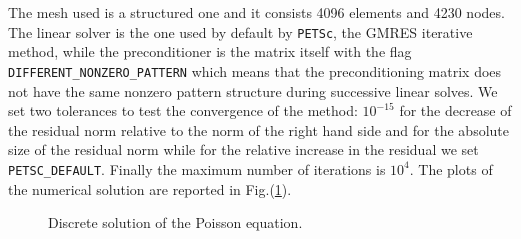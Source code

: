 The mesh used is a structured one and it consists 4096 elements and 4230 nodes. The linear solver is the one used by default by \verb|PETSc|, the GMRES iterative method, while the preconditioner is the matrix itself with the flag \verb|DIFFERENT_NONZERO_PATTERN| which means that the preconditioning matrix does not have the same nonzero pattern structure during successive linear solves. We set two tolerances to test the convergence of the method: $10^{-15}$ for the decrease of the residual norm relative to the norm of the right hand side and for the absolute size of the residual norm while for the relative increase in the residual we set \verb|PETSC_DEFAULT|. Finally the maximum number of iterations is $10^4$. The plots of the numerical solution are reported in Fig.(\ref{fig:poisson}).

\begin{figure}
\centering
{}
\caption{Discrete solution of the Poisson equation.}\label{fig:poisson}
\end{figure}

